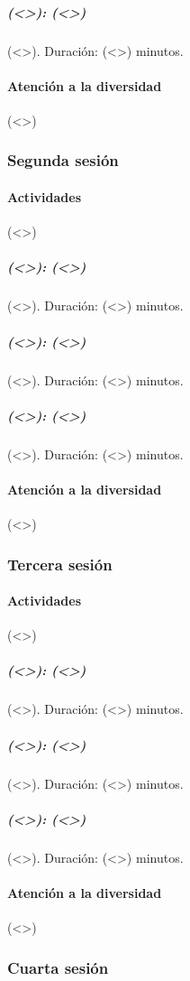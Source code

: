 \documentclass[12pt]{article}
\begin{document}
\subparagraph{\textsc{(<>)}: (<>)} (<>). Duración: (<>) minutos.

\paragraph{Atención a la diversidad} (<>)

\subsubsection{Segunda sesión}

\paragraph*{Actividades} (<>)

\subparagraph{\textsc{(<>)}: (<>)} (<>). Duración: (<>) minutos.

\subparagraph{\textsc{(<>)}: (<>)} (<>). Duración: (<>) minutos.

\subparagraph{\textsc{(<>)}: (<>)} (<>). Duración: (<>) minutos.

\paragraph{Atención a la diversidad} (<>)

\subsubsection{Tercera sesión}

\paragraph*{Actividades} (<>)

\subparagraph{\textsc{(<>)}: (<>)} (<>). Duración: (<>) minutos.

\subparagraph{\textsc{(<>)}: (<>)} (<>). Duración: (<>) minutos.

\subparagraph{\textsc{(<>)}: (<>)} (<>). Duración: (<>) minutos.

\paragraph{Atención a la diversidad} (<>)

\subsubsection{Cuarta sesión}
\end{document}
